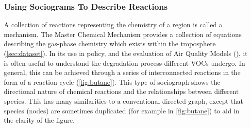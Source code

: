 
\subsubsection{Using Sociograms To Describe Reactions}\label{sec:mcmgraph}

A collection of reactions representing the chemistry of a region is called a mechanism. The Master Chemical Mechanism \citep{mcm} provides a collection of equations describing the gas-phase chemistry which exists within the troposphere (\autoref{sec:dataset}). In its use in policy, and the evaluation of Air Quality Models (\citep{defra1}), it is often useful to understand the degradation process different VOCs undergo. In general, this can be achieved through a series of interconnected reactions in the form of a reaction cycle (\autoref{fig:butane}). This type of sociograph shows the directional nature of chemical reactions and the relationships between different species. This has many similarities to a conventional directed graph, except that species (nodes) are sometimes duplicated (for example  in \autoref{fig:butane}) to aid in the clarity of the figure.

